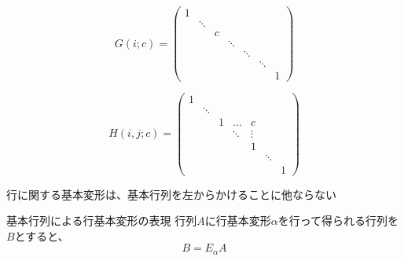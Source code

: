 \documentclass[../../../topic_linear-algebra]{subfiles}
\begin{document}
\begin{equation*}
  G(i;c) = \begin{pmatrix}
    1                                            \\
     & \ddots                                    \\
     &        & c &                              \\
     &        &   & \ddots                       \\
     &        &   &        & \ddots              \\
     &        &   &        &        & \ddots     \\
     &        &   &        &        &        & 1
  \end{pmatrix}
\end{equation*}

\begin{equation*}
  H(i,j;c) = \begin{pmatrix}
    1                                            \\
     & \ddots                                    \\
     &        & 1 & \dots  & c                   \\
     &        &   & \ddots & \vdots              \\
     &        &   &        & 1                   \\
     &        &   &        &        & \ddots     \\
     &        &   &        &        &        & 1
  \end{pmatrix}
\end{equation*}

\sectionline

行に関する基本変形は、基本行列を左からかけることに他ならない

\begin{theorem*}{基本行列による行基本変形の表現}
  行列$A$に行基本変形$\alpha$を行って得られる行列を$B$とすると、
  \begin{equation*}
    B = E_\alpha A
  \end{equation*}
\end{theorem*}
\end{document}
